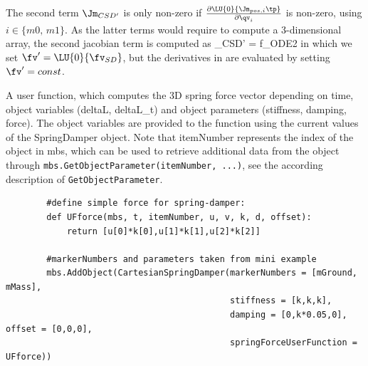     The second term $\Jm_{CSD'}$ is only non-zero if $\frac{\partial \LU{0}{\Jm_{pos,i}\tp}}{\partial \qv_{i}}$ is non-zero, using $i \in \{m0, \, m1\}$.
    As the latter terms would require to compute a 3-dimensional array, the second jacobian term is computed as 
    \be \label{eq_ObjectCartesianSpringDamper_jacDeriv}
      \Jm_{CSD'} = 
                      { f_{ODE2}}
    \ee
    in which we set $\fv' = \LU{0}{\fv_{SD}}$, but the derivatives in  are evaluated by setting $\fv' = const$.

    A user function, which computes the 3D spring force vector depending on time, object variables (deltaL, deltaL\_t) and object parameters 
    (stiffness, damping, force).
    The object variables are provided to the function using the current values of the SpringDamper object.
    Note that itemNumber represents the index of the object in mbs, which can be used to retrieve additional data from the object through
    \texttt{mbs.GetObjectParameter(itemNumber, ...)}, see the according description of \texttt{GetObjectParameter}.
    \finishTable
    \userFunctionExample{}
    \pythonstyle\begin{lstlisting}
        #define simple force for spring-damper:
        def UFforce(mbs, t, itemNumber, u, v, k, d, offset): 
            return [u[0]*k[0],u[1]*k[1],u[2]*k[2]]
        
        #markerNumbers and parameters taken from mini example
        mbs.AddObject(CartesianSpringDamper(markerNumbers = [mGround, mMass], 
                                            stiffness = [k,k,k], 
                                            damping = [0,k*0.05,0], offset = [0,0,0],
                                            springForceUserFunction = UFforce))
    \end{lstlisting}
